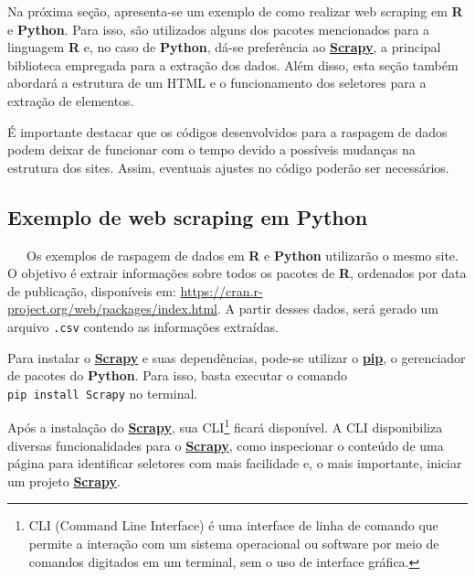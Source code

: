 \documentclass[
  12pt,
  a4paper,
]{scrreprt}
\begin{document}
\vspace{12pt}

Na próxima seção, apresenta-se um exemplo de como realizar web scraping
em \textbf{R} e \textbf{Python}. Para isso, são utilizados alguns dos
pacotes mencionados para a linguagem \textbf{R} e, no caso de
\textbf{Python}, dá-se preferência ao
\href{https://docs.scrapy.org/en/latest}{\textbf{Scrapy}}, a principal
biblioteca empregada para a extração dos dados. Além disso, esta seção
também abordará a estrutura de um HTML e o funcionamento dos seletores
para a extração de elementos.

\vspace{12pt}

É importante destacar que os códigos desenvolvidos para a raspagem de
dados podem deixar de funcionar com o tempo devido a possíveis mudanças
na estrutura dos sites. Assim, eventuais ajustes no código poderão ser
necessários.

\subsection{Exemplo de web scraping em
Python}\label{exemplo-de-web-scraping-em-python}

~~~Os exemplos de raspagem de dados em \textbf{R} e \textbf{Python}
utilizarão o mesmo site. O objetivo é extrair informações sobre todos os
pacotes de \textbf{R}, ordenados por data de publicação, disponíveis em:
\url{https://cran.r-project.org/web/packages/index.html}. A partir
desses dados, será gerado um arquivo \texttt{.csv} contendo as
informações extraídas.

\vspace{12pt}

Para instalar o
\href{https://docs.scrapy.org/en/latest}{\textbf{Scrapy}} e suas
dependências, pode-se utilizar o
\href{https://pip.pypa.io/en/stable/}{\textbf{pip}}, o gerenciador de
pacotes do \textbf{Python}. Para isso, basta executar o comando
\texttt{pip\ install\ Scrapy} no terminal.

\vspace{12pt}

Após a instalação do
\href{https://docs.scrapy.org/en/latest}{\textbf{Scrapy}}, sua
CLI\footnote{CLI (Command Line Interface) é uma interface de linha de
  comando que permite a interação com um sistema operacional ou software
  por meio de comandos digitados em um terminal, sem o uso de interface
  gráfica.} ficará disponível. A CLI disponibiliza diversas
funcionalidades para o
\href{https://docs.scrapy.org/en/latest}{\textbf{Scrapy}}, como
inspecionar o conteúdo de uma página para identificar seletores com mais
facilidade e, o mais importante, iniciar um projeto
\href{https://docs.scrapy.org/en/latest}{\textbf{Scrapy}}.
\end{document}
